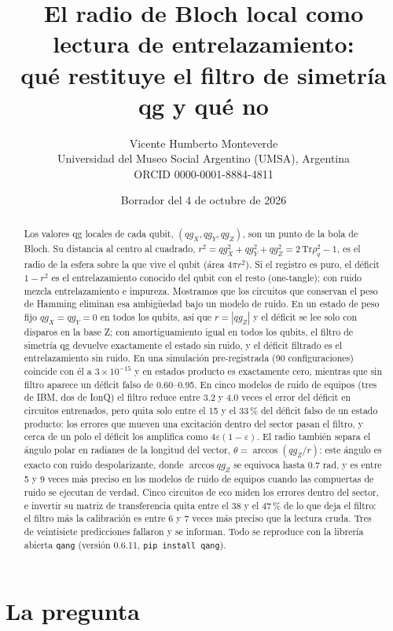 \documentclass[11pt]{article}
\title{El radio de Bloch local como lectura de entrelazamiento:\\
qué restituye el filtro de simetría qg y qué no}
\author{Vicente Humberto Monteverde\\
\small Universidad del Museo Social Argentino (UMSA), Argentina\\
\small ORCID 0000-0001-8884-4811}
\date{\small Borrador del 4 de octubre de 2026}
\newcommand{\qZ}{qg_Z}
\newcommand{\qX}{qg_X}
\newcommand{\qY}{qg_Y}
\begin{document}
\sloppy
\maketitle

\begin{abstract}
Los valores qg locales de cada qubit, $(\qX,\qY,\qZ)$, son un punto de la bola de Bloch. Su distancia al centro al
cuadrado, $r^2=\qX^2+\qY^2+\qZ^2=2\,\mathrm{Tr}\rho_q^2-1$, es el radio de la esfera sobre la que vive el qubit (área
$4\pi r^2$). Si el registro es puro, el déficit $1-r^2$ es el entrelazamiento conocido del qubit con el resto
(one-tangle); con ruido mezcla entrelazamiento e impureza. Mostramos que los circuitos que conservan el peso de Hamming
eliminan esa ambigüedad bajo un modelo de ruido. En un estado de peso fijo $\qX=\qY=0$ en todos los qubits, así que
$r=|\qZ|$ y el déficit se lee solo con disparos en la base Z; con amortiguamiento igual en todos los qubits, el filtro
de simetría qg devuelve exactamente el estado sin ruido, y el déficit filtrado es el entrelazamiento sin ruido. En una
simulación pre-registrada (90 configuraciones) coincide con él a $3\times10^{-15}$ y en estados producto es exactamente
cero, mientras que sin filtro aparece un déficit falso de 0.60--0.95. En cinco modelos de ruido de equipos (tres de IBM,
dos de IonQ) el filtro reduce entre 3.2 y 4.0 veces el error del déficit en circuitos entrenados, pero quita solo entre
el 15 y el 33\,\% del déficit falso de un estado producto: los errores que mueven una excitación dentro del sector pasan
el filtro, y cerca de un polo el déficit los amplifica como $4\varepsilon(1-\varepsilon)$. El radio también separa el
ángulo polar en radianes de la longitud del vector, $\theta=\arccos(\qZ/r)$: este ángulo es exacto con ruido
despolarizante, donde $\arccos\qZ$ se equivoca hasta 0.7 rad, y es entre 5 y 9 veces más preciso en los modelos de
ruido de equipos cuando las compuertas de ruido se ejecutan de verdad. Cinco circuitos de eco miden los errores dentro del sector, e
invertir su matriz de transferencia quita entre el 38 y el 47\,\% de lo que deja el filtro: el filtro más la calibración
es entre 6 y 7 veces más preciso que la lectura cruda. Tres de veintisiete predicciones fallaron y se informan. Todo se reproduce con la librería abierta \texttt{qang} (versión 0.6.11, \texttt{pip install
qang}).
\end{abstract}

\section{La pregunta}
\end{document}
